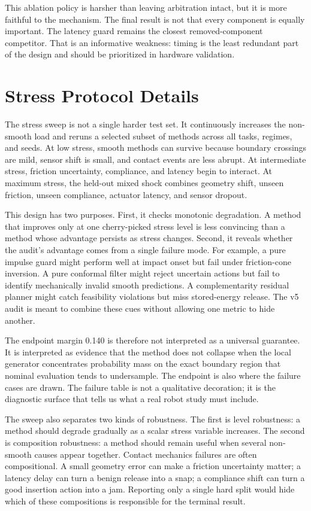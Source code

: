 \documentclass{article}
\begin{document}
This ablation policy is harsher than leaving arbitration intact, but it is more faithful to the mechanism. The final result is not that every component is equally important. The latency guard remains the closest removed-component competitor. That is an informative weakness: timing is the least redundant part of the design and should be prioritized in hardware validation.

\clearpage
\section{Stress Protocol Details}
The stress sweep is not a single harder test set. It continuously increases the non-smooth load and reruns a selected subset of methods across all tasks, regimes, and seeds. At low stress, smooth methods can survive because boundary crossings are mild, sensor shift is small, and contact events are less abrupt. At intermediate stress, friction uncertainty, compliance, and latency begin to interact. At maximum stress, the held-out mixed shock combines geometry shift, unseen friction, unseen compliance, actuator latency, and sensor dropout.

This design has two purposes. First, it checks monotonic degradation. A method that improves only at one cherry-picked stress level is less convincing than a method whose advantage persists as stress changes. Second, it reveals whether the audit's advantage comes from a single failure mode. For example, a pure impulse guard might perform well at impact onset but fail under friction-cone inversion. A pure conformal filter might reject uncertain actions but fail to identify mechanically invalid smooth predictions. A complementarity residual planner might catch feasibility violations but miss stored-energy release. The v5 audit is meant to combine these cues without allowing one metric to hide another.

The endpoint margin 0.140 is therefore not interpreted as a universal guarantee. It is interpreted as evidence that the method does not collapse when the local generator concentrates probability mass on the exact boundary region that nominal evaluation tends to undersample. The endpoint is also where the failure cases are drawn. The failure table is not a qualitative decoration; it is the diagnostic surface that tells us what a real robot study must include.

The sweep also separates two kinds of robustness. The first is level robustness: a method should degrade gradually as a scalar stress variable increases. The second is composition robustness: a method should remain useful when several non-smooth causes appear together. Contact mechanics failures are often compositional. A small geometry error can make a friction uncertainty matter; a latency delay can turn a benign release into a snap; a compliance shift can turn a good insertion action into a jam. Reporting only a single hard split would hide which of these compositions is responsible for the terminal result.
\end{document}
